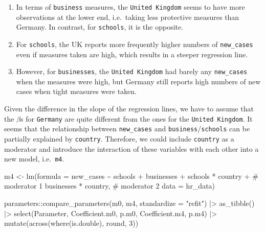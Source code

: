 \documentclass[
  letterpaper,
]{krantz}
\makeatletter
\newenvironment{Shaded}{\begin{snugshade}}{\end{snugshade}}
\newcommand{\AttributeTok}[1]{\textcolor[rgb]{0.40,0.45,0.13}{#1}}
\newcommand{\CommentTok}[1]{\textcolor[rgb]{0.37,0.37,0.37}{#1}}
\newcommand{\DecValTok}[1]{\textcolor[rgb]{0.68,0.00,0.00}{#1}}
\newcommand{\FunctionTok}[1]{\textcolor[rgb]{0.28,0.35,0.67}{#1}}
\newcommand{\NormalTok}[1]{\textcolor[rgb]{0.00,0.23,0.31}{#1}}
\newcommand{\OtherTok}[1]{\textcolor[rgb]{0.00,0.23,0.31}{#1}}
\newcommand{\SpecialCharTok}[1]{\textcolor[rgb]{0.37,0.37,0.37}{#1}}
\newcommand{\StringTok}[1]{\textcolor[rgb]{0.13,0.47,0.30}{#1}}
\providecommand{\tightlist}{%
  \setlength{\itemsep}{0pt}\setlength{\parskip}{0pt}}\usepackage{longtable,booktabs,array}
\newenvironment{kframe}{%
\medskip{}
\setlength{\fboxsep}{.8em}
 \def\at@end@of@kframe{}%
 \ifinner\ifhmode%
  \def\at@end@of@kframe{\end{minipage}}%
  \begin{minipage}{\columnwidth}%
 \fi\fi%
 \def\FrameCommand##1{\hskip\@totalleftmargin \hskip-\fboxsep
 \colorbox{shadecolor}{##1}\hskip-\fboxsep
     \hskip-\linewidth \hskip-\@totalleftmargin \hskip\columnwidth}%
 \MakeFramed {\advance\hsize-\width
   \@totalleftmargin\z@ \linewidth\hsize
   \@setminipage}}%
 {\par\unskip\endMakeFramed%
 \at@end@of@kframe}
\renewenvironment{Shaded}{\begin{kframe}}{\end{kframe}}
\makeatother
\begin{document}
\begin{enumerate}
\def\labelenumi{\arabic{enumi}.}
\tightlist
\item
  In terms of \texttt{business} measures, the \texttt{United\ Kingdom}
  seems to have more observations at the lower end, i.e.~taking less
  protective measures than Germany. In contrast, for \texttt{schools},
  it is the opposite.
\item
  For \texttt{schools}, the UK reports more frequently higher numbers of
  \texttt{new\_cases} even if measures taken are high, which results in
  a steeper regression line.
\item
  However, for \texttt{businesses}, the \texttt{United\ Kingdom} had
  barely any \texttt{new\_cases} when the measures were high, but
  Germany still reports high numbers of new cases when tight measures
  were taken.
\end{enumerate}

Given the difference in the slope of the regression lines, we have to
assume that the \(\beta\)s for \texttt{Germany} are quite different from
the ones for the \texttt{United\ Kingdom}. It seems that the
relationship between \texttt{new\_cases} and
\texttt{business}/\texttt{schools} can be partially explained by
\texttt{country}. Therefore, we could include \texttt{country} as a
moderator and introduce the interaction of these variables with each
other into a new model, i.e.~\texttt{m4}.

\begin{Shaded}
\begin{Highlighting}[]
\NormalTok{m4 }\OtherTok{\textless{}{-}} \FunctionTok{lm}\NormalTok{(}\AttributeTok{formula =}\NormalTok{ new\_cases }\SpecialCharTok{\textasciitilde{}}
\NormalTok{           schools }\SpecialCharTok{+}
\NormalTok{           businesses }\SpecialCharTok{+}
\NormalTok{           schools }\SpecialCharTok{*}\NormalTok{ country }\SpecialCharTok{+}  \CommentTok{\# moderator 1}
\NormalTok{           businesses }\SpecialCharTok{*}\NormalTok{ country, }\CommentTok{\# moderator 2}
         \AttributeTok{data =}\NormalTok{ hr\_data)}

\NormalTok{parameters}\SpecialCharTok{::}\FunctionTok{compare\_parameters}\NormalTok{(m0, m4, }\AttributeTok{standardize =} \StringTok{"refit"}\NormalTok{) }\SpecialCharTok{|\textgreater{}}
  \FunctionTok{as\_tibble}\NormalTok{() }\SpecialCharTok{|\textgreater{}}
  \FunctionTok{select}\NormalTok{(Parameter, Coefficient.m0, p.m0, Coefficient.m4, p.m4) }\SpecialCharTok{|\textgreater{}}
  \FunctionTok{mutate}\NormalTok{(}\FunctionTok{across}\NormalTok{(}\FunctionTok{where}\NormalTok{(is.double), round, }\DecValTok{3}\NormalTok{))}
\end{Highlighting}
\end{Shaded}
\end{document}
